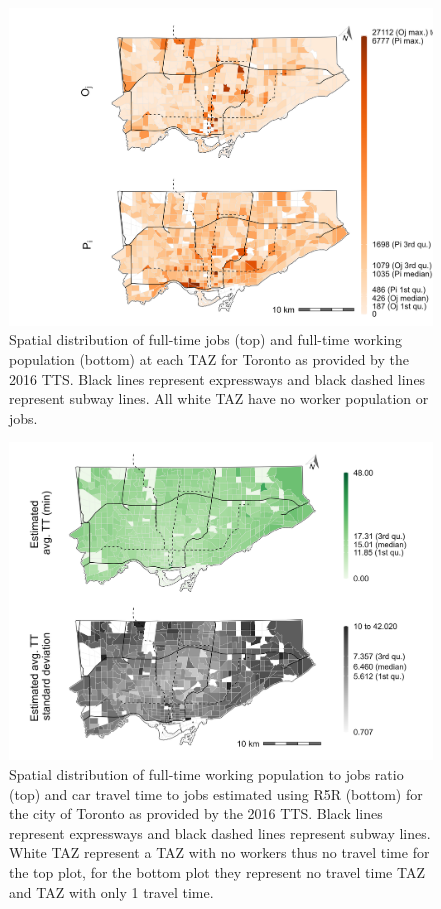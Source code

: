 \documentclass[10pt,letterpaper]{article}
\begin{document}
\begin{figure}
\includegraphics[width=1\linewidth]{images/Fig4} \caption{\label{fig:Fig4}  Spatial distribution of full-time jobs (top) and full-time working population (bottom) at each TAZ for Toronto as provided by the 2016 TTS. Black lines represent expressways and black dashed lines represent subway lines. All white TAZ have no worker population or jobs.}\label{fig:spatial-dist-Toronto-plot}
\end{figure}

\begin{figure}
\includegraphics[width=1\linewidth]{images/Fig5} \caption{\label{fig:Fig5}  Spatial distribution of full-time working population to jobs ratio (top) and car travel time to jobs estimated using R5R (bottom) for the city of Toronto as provided by the 2016 TTS. Black lines represent expressways and black dashed lines represent subway lines. White TAZ represent a TAZ with no workers thus no travel time for the top plot, for the bottom plot they represent no travel time TAZ and TAZ with only 1 travel time.}\label{fig:spatial-dist-Toronto-plot2}
\end{figure}
\end{document}
